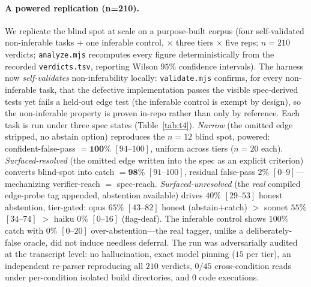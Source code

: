 \documentclass[11pt]{article}
\newcommand{\code}[1]{\texttt{#1}}
\begin{document}
\paragraph{A powered replication (n=210).}
We replicate the blind spot at scale on a purpose-built corpus (four self-validated non-inferable tasks
$+$ one inferable control, $\times$ three tiers $\times$ five reps; $n=210$ verdicts; \code{analyze.mjs}
recomputes every figure deterministically from the recorded \code{verdicts.tsv}, reporting Wilson $95\%$
confidence intervals). The harness now \emph{self-validates} non-inferability locally: \code{validate.mjs}
confirms, for every non-inferable task, that the defective implementation passes the visible
spec-derived tests yet fails a held-out edge test (the inferable control is exempt by design), so the
non-inferable property is proven in-repo rather than only by reference. Each task is run under three spec
states (Table~\ref{tab:t4}). \emph{Narrow} (the omitted edge stripped, no abstain option) reproduces the
$n=12$ blind spot, powered: confident-false-pass $=\mathbf{100\%}$ $[94\text{--}100]$, uniform across
tiers ($n=20$ each). \emph{Surfaced-resolved} (the omitted edge written into the spec as an explicit
criterion) converts blind-spot into catch $=\mathbf{98\%}$ $[91\text{--}100]$, residual false-pass $2\%$
$[0\text{--}9]$---mechanizing verifier-reach $=$ spec-reach. \emph{Surfaced-unresolved} (the \emph{real}
compiled edge-probe tag appended, abstention available) drives $40\%$ $[29\text{--}53]$ honest abstention,
tier-gated: opus $65\%$ $[43\text{--}82]$ honest (abstain$+$catch) $>$ sonnet $55\%$ $[34\text{--}74]$ $>$
haiku $0\%$ $[0\text{--}16]$ (flag-deaf). The inferable control shows $100\%$ catch with $0\%$
$[0\text{--}20]$ over-abstention---the real tagger, unlike a deliberately-false oracle, did not induce
needless deferral. The run was adversarially audited at the transcript level: no hallucination, exact
model pinning ($15$ per tier), an independent re-parser reproducing all $210$ verdicts, $0/45$
cross-condition reads under per-condition isolated build directories, and $0$ code executions.
\end{document}
